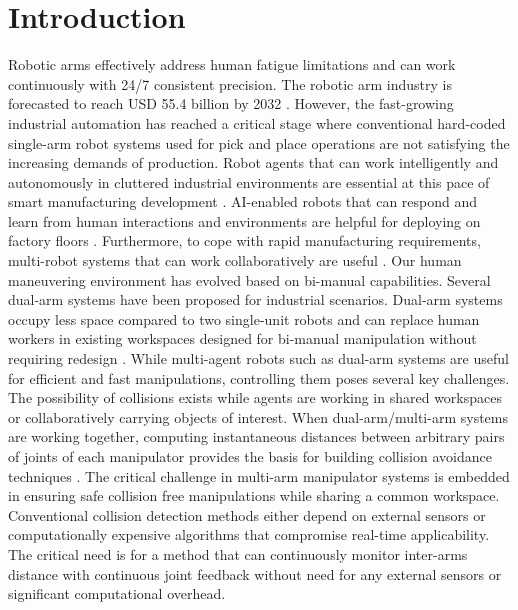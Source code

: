 \documentclass[10pt,twocolumn]{ICCAS}
\begin{document}
\maketitle

\section{Introduction}
\label{introduction}
Robotic arms effectively address human fatigue limitations and can work continuously with 24/7 consistent precision. The robotic arm industry is forecasted to reach USD 55.4 billion by 2032 \cite{develop2024robotic}. However, the fast-growing industrial automation has reached a critical stage where conventional hard-coded single-arm robot systems used for pick and place operations are not satisfying the increasing demands of production. Robot agents that can work intelligently and autonomously in cluttered industrial environments are essential at this pace of smart manufacturing development \cite{10711806}\cite{10843915}. AI-enabled robots that can respond and learn from human interactions and environments are helpful for deploying on factory floors \cite{RobotsandArtificialIntelligence}. Furthermore, to cope with rapid manufacturing requirements, multi-robot systems that can work collaboratively are useful \cite{gan2019multi}. Our human maneuvering environment has evolved based on bi-manual capabilities. Several dual-arm systems \cite{sepulveda2020robotic}\cite{lee2022peg}\cite{polverini2019constraint} have been proposed for industrial scenarios. Dual-arm systems occupy less space compared to two single-unit robots and can replace human workers in existing workspaces designed for bi-manual manipulation without requiring redesign \cite{smith2012dual}\cite{makris2017dual}. While multi-agent robots such as dual-arm systems are useful for efficient and fast manipulations, controlling them poses several key challenges. The possibility of collisions exists while agents are working in shared workspaces or collaboratively carrying objects of interest. When dual-arm/multi-arm systems are working together, computing instantaneous distances between arbitrary pairs of joints of each manipulator provides the basis for building collision avoidance techniques \cite{lin1993efficient}.
The critical challenge in multi-arm manipulator systems is embedded in ensuring safe collision free manipulations while sharing a common workspace.  Conventional collision detection methods either depend on external sensors or computationally expensive algorithms that compromise real-time applicability. The critical need is for a method that can continuously monitor inter-arms distance with continuous joint feedback without need for any external sensors or significant computational overhead.
\end{document}
